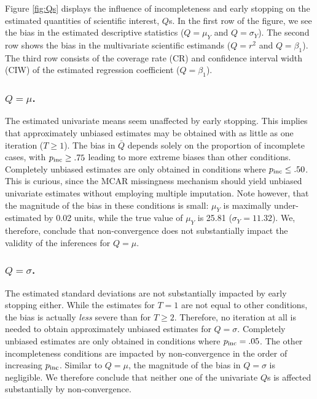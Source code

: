 \documentclass[Royal,times,sageh]{sagej}
\begin{document}
Figure \ref{fig:Qs} displays the influence of incompleteness and early stopping on the estimated quantities of scientific interest, \(Q\)s. In the first row of the figure, we see the bias in the estimated descriptive statistics (\(Q=\mu_Y\) and \(Q=\sigma_Y\)). The second row shows the bias in the multivariate scientific estimands (\(Q=r^2\) and \(Q=\beta_1\)). The third row consists of the coverage rate (CR) and confidence interval width (CIW) of the estimated regression coefficient (\(Q=\beta_1\)).

\hypertarget{qmu.}{%
\subsubsection{\texorpdfstring{\(Q=\mu\).}{Q=\textbackslash mu.}}\label{qmu.}}

The estimated univariate means seem unaffected by early stopping. This implies that approximately unbiased estimates may be obtained with as little as one iteration (\(T \geq 1\)). The bias in \(\bar{Q}\) depends solely on the proportion of incomplete cases, with \(p_{\rm inc}\geq.75\) leading to more extreme biases than other conditions. Completely unbiased estimates are only obtained in conditions where \(p_{\rm inc}\leq.50\). This is curious, since the MCAR missingness mechanism should yield unbiased univariate estimates without employing multiple imputation. Note however, that the magnitude of the bias in these conditions is small: \(\mu_Y\) is maximally under-estimated by 0.02 units, while the true value of \(\mu_Y\) is 25.81 (\(\sigma_Y = 11.32\)). We, therefore, conclude that non-convergence does not substantially impact the validity of the inferences for \(Q=\mu\).

\hypertarget{qsigma.}{%
\subsubsection{\texorpdfstring{\(Q=\sigma\).}{Q=\textbackslash sigma.}}\label{qsigma.}}

The estimated standard deviations are not substantially impacted by early stopping either. While the estimates for \(T=1\) are not equal to other conditions, the bias is actually \emph{less} severe than for \(T\geq2\). Therefore, no iteration at all is needed to obtain approximately unbiased estimates for \(Q=\sigma\). Completely unbiased estimates are only obtained in conditions where \(p_{\rm inc}=.05\). The other incompleteness conditions are impacted by non-convergence in the order of increasing \(p_{\rm inc}\). Similar to \(Q=\mu\), the magnitude of the bias in \(Q=\sigma\) is negligible. We therefore conclude that neither one of the univariate \(Q\)s is affected substantially by non-convergence.
\end{document}
